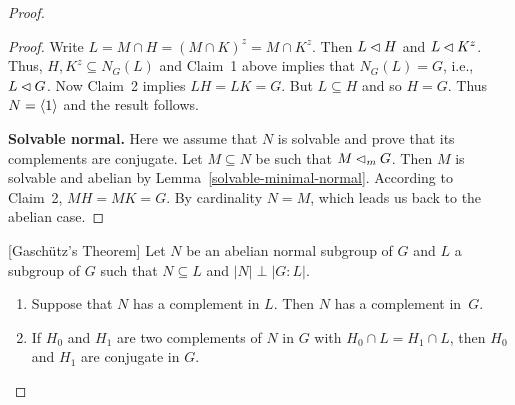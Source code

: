 \begin{solution}
\begin{proof}
\begin{proof}
    Write $L=M\cap H=(M\cap K)^z=M\cap K^z$. Then $L\lhd H$ and $L\lhd K^z$. Thus, $H, K^z\subseteq N_G(L)$ and Claim~1 above implies that $N_G(L)=G$, i.e., $L\lhd G$. Now Claim~2 implies $LH=LK=G$. But $L\subseteq H$ and so $H=G$. Thus $N=\langle1\rangle$ and the result follows.
    
    
    \textbf{Solvable normal.} Here we assume that $N$ is solvable and prove that its complements are conjugate. Let $M\subseteq N$ be such that $M\lhd_m G$. Then $M$ is solvable and abelian by Lemma~\ref{solvable-minimal-normal}. According to Claim~2, $MH=MK=G$. By cardinality $N=M$, which leads us back to the abelian case.  \end{proof} 

\begin{thm}\label{gaschütz} {\rm[Gaschütz's Theorem]} Let\/ $N$ be an abelian normal subgroup of\/ $G$ and\/ $L$ a subgroup of\/ $G$ such that\/ $N\subseteq L$ and\/ $|N|\perp|G:L|$.
    \begin{enumerate}[\rm a)]
    \item Suppose that\/ $N$ has a complement in\/ $L$. Then\/ $N$ has a complement in\/~$G$.
    \item If\/ $H_0$ and\/ $H_1$ are two complements of\/ $N$ in\/ $G$ with\/ $H_0 \cap L = H_1 \cap L$, then\/ $H_0$ and\/ $H_1$ are conjugate in\/ $G$.
    \end{enumerate}
\end{thm}


\end{proof}
\end{solution}
